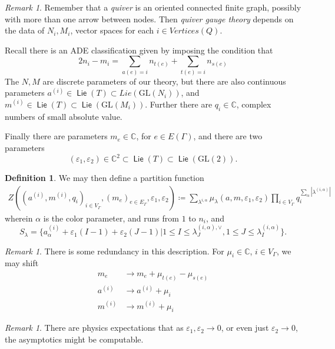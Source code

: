 \documentclass[leqno, openany]{memoir}
\theoremstyle{definition}
\newtheorem{defn}[thm]{Definition}
\theoremstyle{remark}
\newtheorem{rmk}[thm]{Remark}
\theoremstyle{plain}
\theoremstyle{definition}
\theoremstyle{remark}
\newcommand{\ep}{\varepsilon}
\newcommand{\mr}[1]{\mathrm{#1}}
\newcommand{\ms}[1]{\mathsf{#1}}
\newcommand{\GL}{\mr{GL}}
\DeclareMathOperator{\Lie}{\ms{Lie}}
\begin{document}
\begin{rmk}
Remember that a \emph{quiver} is an oriented connected finite graph, possibly with more than one arrow between nodes. 
Then \emph{quiver gauge theory} depends on the data of $N_i, M_i$, vector spaces for each $i \in Vertices(Q)$.

Recall there is an ADE classification given by imposing the condition that 
\[
2n_i - m_i = \sum_{a(e) = i} n_{t(e)} + \sum_{t(e) = i} n_{s(e)}
\]
The $N,M$ are discrete parameters of our theory, but there are also 
continuous parameters $a^{(i)} \in \Lie(T) \subset Lie(\GL(N_i))$,
and $m^{(i)} \in \Lie(T) \subset \Lie(\GL(M_i))$. 
Further there are $q_i \in \mathbb{C}$, complex numbers of small absolute value.

Finally there are parameters $m_e \in \mathbb{C}$, for $e \in E(\Gamma)$, and there are two parameters
\[
(\ep_1,\ep_2)\in \mathbb{C}^2 \subset \Lie(T) \subset \Lie(\GL(2)).
\]
\end{rmk}

\begin{defn}
We may then define a partition function 
\begin{align*}
Z((a^{(i)},m^{(i)}, q_i)_{i \in V_\Gamma}, (m_e)_{e \in E_\Gamma},\ep_1,\ep_2) \coloneqq \sum_{\lambda^{i,\alpha}} \mu_\lambda(a,m,\ep_1,\ep_2) \prod_{i \in V_\Gamma} q_i^{\sum_\alpha |\lambda^{(i,\alpha)}|}
\end{align*}
wherein $\alpha$ is the color parameter, and runs from $1$ to $n_i$,
and 
\[
S_{\lambda} = \{ a_\alpha^{(i)} + \ep_1(I -1) + \ep_2(J-1) | 1 \leq I \leq \lambda_J^{(i,\alpha),\vee}, 1 \leq J \leq \lambda_I^{(i,\alpha)}\}.
\]
\end{defn}

\begin{rmk}
There is some redundancy in this description. For $\mu_i \in \mathbb{C}$, $i \in V_\Gamma$, we may shift
\begin{align*}
    m_e &\to m_e + \mu_{t(e)} - \mu_{s(e)}
\\
    a^{(i)} &\to a^{(i)} + \mu_i
\\
    m^{(i)} &\to m^{(i)} + \mu_i 
\end{align*}
\end{rmk}

\begin{rmk}
There are physics expectations that as $\ep_1,\ep_2 \to 0$, or even just $\ep_2 \to 0$, the asymptotics might be computable.
\end{rmk}
\end{document}

